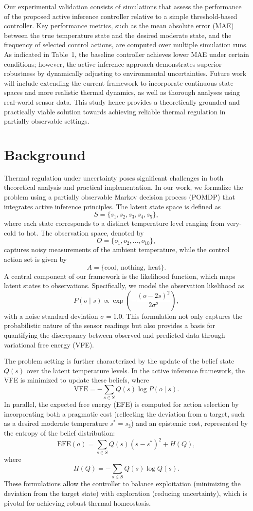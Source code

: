 \documentclass[11pt]{article}
\begin{document}
Our experimental validation consists of simulations that assess the performance of the proposed active inference controller relative to a simple threshold-based controller. Key performance metrics, such as the mean absolute error (MAE) between the true temperature state and the desired moderate state, and the frequency of selected control actions, are computed over multiple simulation runs. As indicated in Table~1, the baseline controller achieves lower MAE under certain conditions; however, the active inference approach demonstrates superior robustness by dynamically adjusting to environmental uncertainties. Future work will include extending the current framework to incorporate continuous state spaces and more realistic thermal dynamics, as well as thorough analyses using real-world sensor data. This study hence provides a theoretically grounded and practically viable solution towards achieving reliable thermal regulation in partially observable settings.

\section{Background}
Thermal regulation under uncertainty poses significant challenges in both theoretical analysis and practical implementation. In our work, we formalize the problem using a partially observable Markov decision process (POMDP) that integrates active inference principles. The latent state space is defined as 
\[
S = \{s_1, s_2, s_3, s_4, s_5\},
\]
where each state corresponds to a distinct temperature level ranging from very-cold to hot. The observation space, denoted by 
\[
O = \{o_1, o_2, \ldots, o_{10}\},
\]
captures noisy measurements of the ambient temperature, while the control action set is given by 
\[
A = \{\text{cool},\ \text{nothing},\ \text{heat}\}.
\]
A central component of our framework is the likelihood function, which maps latent states to observations. Specifically, we model the observation likelihood as
\[
P(o \mid s) \propto \exp\left(-\frac{(o-2s)^2}{2\sigma^2}\right),
\]
with a noise standard deviation \(\sigma = 1.0\). This formulation not only captures the probabilistic nature of the sensor readings but also provides a basis for quantifying the discrepancy between observed and predicted data through variational free energy (VFE).

The problem setting is further characterized by the update of the belief state \(Q(s)\) over the latent temperature levels. In the active inference framework, the VFE is minimized to update these beliefs, where
\[
\text{VFE} = -\sum_{s \in S} Q(s) \log P(o \mid s).
\]
In parallel, the expected free energy (EFE) is computed for action selection by incorporating both a pragmatic cost (reflecting the deviation from a target, such as a desired moderate temperature \(s^* = s_3\)) and an epistemic cost, represented by the entropy of the belief distribution:
\[
\text{EFE}(a) = \sum_{s \in S} Q(s) (s - s^*)^2 + H(Q),
\]
where 
\[
H(Q) = -\sum_{s \in S} Q(s) \log Q(s).
\]
These formulations allow the controller to balance exploitation (minimizing the deviation from the target state) with exploration (reducing uncertainty), which is pivotal for achieving robust thermal homeostasis.
\end{document}
